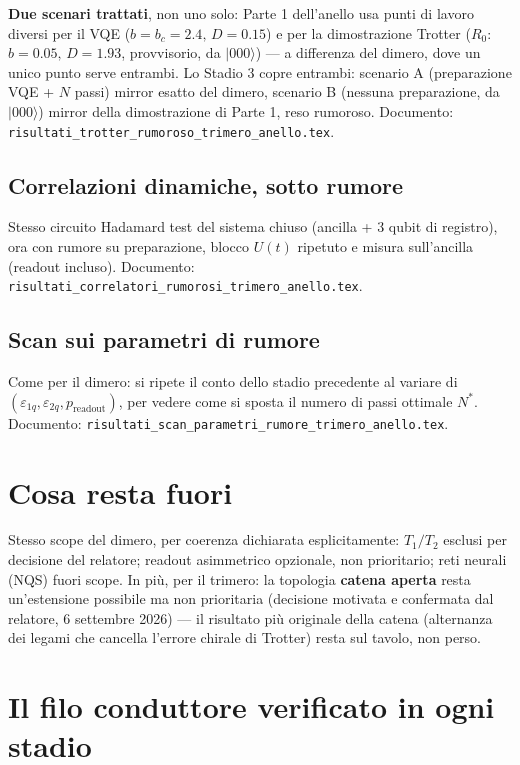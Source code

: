 \documentclass[11pt,a4paper]{article}
\newcommand{\ket}[1]{\lvert #1 \rangle}
\begin{document}
\textbf{Due scenari trattati}, non uno solo: Parte 1 dell'anello usa
punti di lavoro diversi per il VQE ($b=b_c=2.4,\,D=0.15$) e per la
dimostrazione Trotter ($R_0$: $b=0.05,\,D=1.93$, provvisorio, da
$\ket{000}$) --- a differenza del dimero, dove un unico punto serve
entrambi. Lo Stadio 3 copre entrambi: scenario A (preparazione VQE + $N$
passi) mirror esatto del dimero, scenario B (nessuna preparazione, da
$\ket{000}$) mirror della dimostrazione di Parte 1, reso rumoroso.
Documento:
\texttt{risultati\_\allowbreak trotter\_\allowbreak rumoroso\_trimero\_anello.tex}.

\subsection{Correlazioni dinamiche, sotto rumore}

Stesso circuito Hadamard test del sistema chiuso (ancilla + 3 qubit di
registro), ora con rumore su preparazione, blocco $U(t)$ ripetuto e
misura sull'ancilla (readout incluso). Documento:
\texttt{risultati\_correlatori\_\allowbreak rumorosi\_trimero\_anello.tex}.

\subsection{Scan sui parametri di rumore}

Come per il dimero: si ripete il conto dello stadio precedente al
variare di $(\varepsilon_{1q},\varepsilon_{2q},p_\text{readout})$, per
vedere come si sposta il numero di passi ottimale $N^*$. Documento:
\texttt{risultati\_scan\_\allowbreak parametri\_rumore\_trimero\_anello.tex}.

\section{Cosa resta fuori}

Stesso scope del dimero, per coerenza dichiarata esplicitamente:
$T_1/T_2$ esclusi per decisione del relatore; readout asimmetrico
opzionale, non prioritario; reti neurali (NQS) fuori scope. In più, per
il trimero: la topologia \textbf{catena aperta} resta un'estensione
possibile ma non prioritaria (decisione motivata e confermata dal
relatore, 6 settembre 2026) --- il risultato più originale della catena
(alternanza dei legami che cancella l'errore chirale di Trotter) resta
sul tavolo, non perso.

\section{Il filo conduttore verificato in ogni stadio}
\end{document}
